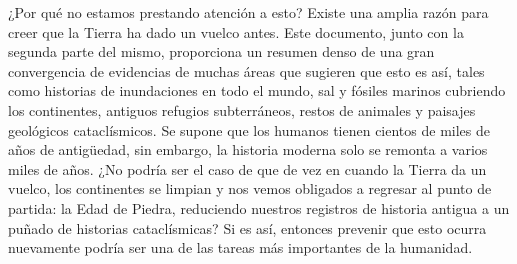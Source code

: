 \documentclass[10pt,twocolumn,letterpaper]{article}
\begin{document}
¿Por qué no estamos prestando atención a esto? Existe una amplia razón para creer que la Tierra ha dado un vuelco antes. Este documento, junto con la segunda parte del mismo, proporciona un resumen denso de una gran convergencia de evidencias de muchas áreas que sugieren que esto es así, tales como historias de inundaciones en todo el mundo, sal y fósiles marinos cubriendo los continentes, antiguos refugios subterráneos, restos de animales y paisajes geológicos cataclísmicos. Se supone que los humanos tienen cientos de miles de años de antigüedad, sin embargo, la historia moderna solo se remonta a varios miles de años. ¿No podría ser el caso de que de vez en cuando la Tierra da un vuelco, los continentes se limpian y nos vemos obligados a regresar al punto de partida: la Edad de Piedra, reduciendo nuestros registros de historia antigua a un puñado de historias cataclísmicas? Si es así, entonces prevenir que esto ocurra nuevamente podría ser una de las tareas más importantes de la humanidad.
\end{document}
